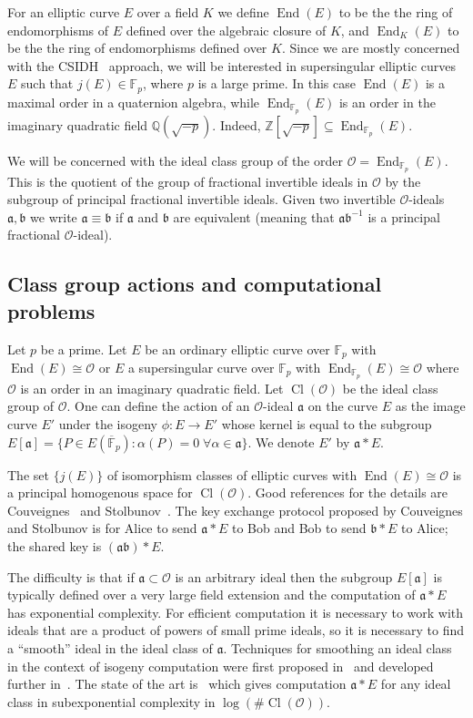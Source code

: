 \documentclass{llncs}
\newcommand{\F}{\mathbb{F}}
\newcommand{\Fpbar}{\overline{\mathbb{F}}_p}
\newcommand{\OO}{\mathcal{O}}
\newcommand{\Q}{\mathbb{Q}}
\newcommand{\Z}{\mathbb{Z}}
\DeclareMathOperator{\End}{End}
\DeclareMathOperator{\Cl}{Cl}
\renewcommand{\a}{\mathfrak{a}}
\renewcommand{\b}{\mathfrak{b}}
\begin{document}
For an elliptic curve $E$ over a field $K$ we define $\End(E)$ to be the the ring of endomorphisms of $E$ defined over the algebraic closure of $K$, and $\End_K(E)$ to be the the ring of endomorphisms defined over $K$.
Since we are mostly concerned with the CSIDH~\cite{CLMPR18} approach, we will be interested in supersingular elliptic curves $E$ such that $j(E) \in \F_p$, where $p$ is a large prime.
In this case $\End( E )$ is a maximal order in a quaternion algebra, while $\End_{\F_p}(E)$ is an order in the imaginary quadratic field $\Q( \sqrt{-p} )$.
Indeed, $\Z[ \sqrt{-p} ] \subseteq \End_{\F_p}(E)$.

We will be concerned with the ideal class group of the order $\OO = \End_{\F_p}(E)$.
This is the quotient of the group of fractional invertible ideals in $\OO$ by the subgroup of principal fractional invertible ideals.
Given two invertible $\OO$-ideals $\a, \b$ we write $\a \equiv \b$ if $\a$ and $\b$ are equivalent (meaning that $\a \b^{-1}$ is a principal fractional $\OO$-ideal). 


 

\subsection{Class group actions and computational problems}

Let $p$ be a prime.
Let $E$ be an ordinary elliptic curve over $\F_p$ with $\End(E) \cong \OO$ or $E$ a supersingular curve over $\F_p$ with $\End_{\F_p}(E) \cong \OO$ where $\OO$ is an order in an imaginary quadratic field.
Let $\Cl(\OO )$ be the ideal class group of $\OO$.
One can define the action of an $\OO$-ideal $\a$ on the curve $E$ as the image curve $E'$ under the isogeny $\phi : E \to E'$ whose kernel is equal to the subgroup $E[ \a ] = \{ P \in E( \Fpbar ) : \alpha(P) = 0 \; \forall \alpha \in \a \}$.
We denote $E'$ by $\a * E$.

The set $\{ j(E) \}$ of isomorphism classes of elliptic curves with $\End(E) \cong \OO$ is a principal homogenous space for $\Cl(\OO )$.
Good references for the details are Couveignes~\cite{Couv06} and Stolbunov~\cite{Sto12}.
The key exchange protocol proposed by Couveignes and Stolbunov is for Alice to send $\a * E$ to Bob and Bob to send $\b * E$ to Alice; the shared key is $(\a\b) * E$.


The difficulty is that if $\a\subset\OO$ is an arbitrary ideal then the subgroup $E[ \a ]$ is typically defined over a very large field extension and the computation of $\a*E$ has exponential complexity.
For efficient computation it is necessary to work with ideals that are a product of powers of small prime ideals, so it is necessary to find a ``smooth'' ideal in the ideal class of $\a$.
Techniques for smoothing an ideal class in the context of isogeny computation were first proposed in~\cite{GHS02} and developed further in~\cite{BCL08,JS10,biasse_fieker_jacobson_2016}.
The state of the art is~\cite{biasse_fieker_jacobson_2016} which gives computation $\a * E$ for any ideal class in subexponential complexity in $\log(\#\Cl(\OO))$.
\end{document}
